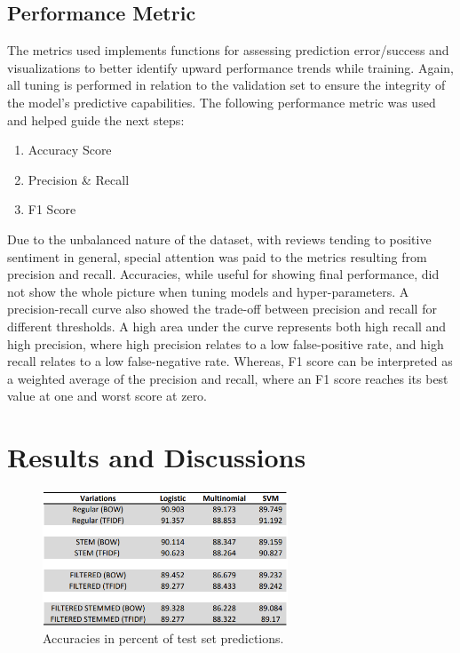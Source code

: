 \documentclass[conference , 11pt]{IEEEtran}
\begin{document}
\subsection{Performance Metric}
The metrics used implements functions for assessing prediction error/success and visualizations to better identify upward performance trends while training. Again, all tuning is performed in relation to the validation set to ensure the integrity of the model's predictive capabilities. The following performance metric was used and helped guide the next steps:
\begin{enumerate}
\item Accuracy Score
\item Precision \& Recall
\item F1 Score
\end{enumerate}
Due to the unbalanced nature of the dataset, with reviews tending to positive sentiment in general, special attention was paid to the metrics resulting from precision and recall. Accuracies, while useful for showing final performance, did not show the whole picture when tuning models and hyper-parameters. A precision-recall curve also showed the trade-off between precision and recall for different thresholds. A high area under the curve represents both high recall and high precision, where high precision relates to a low false-positive rate, and high recall relates to a low false-negative rate. Whereas, F1 score can be interpreted as a weighted average  of the precision and recall, where an F1 score reaches its best value at one and worst score at zero.

\section{Results and Discussions}
\begin{figure}[htbp]
\centerline{\includegraphics[width=0.9\columnwidth , height=4cm]{test-prediction-main.png}}
\caption{Accuracies in percent of test set predictions.}
\label{fig}
\end{figure}
\end{document}
